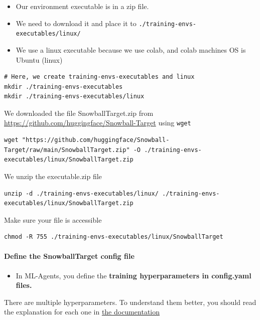 \documentclass[11pt,a4paper]{article}
\begin{document}
\begin{itemize}
\tightlist
\item
  Our environment executable is in a zip file.
\item
  We need to download it and place it to \texttt{./training-envs-executables/linux/}
\item
  We use a linux executable because we use colab, and colab machines OS is Ubuntu (linux)
\end{itemize}

\begin{lstlisting}
# Here, we create training-envs-executables and linux
mkdir ./training-envs-executables
mkdir ./training-envs-executables/linux
\end{lstlisting}

We downloaded the file SnowballTarget.zip from \url{https://github.com/huggingface/Snowball-Target} using \texttt{wget}

\begin{lstlisting}
wget "https://github.com/huggingface/Snowball-Target/raw/main/SnowballTarget.zip" -O ./training-envs-executables/linux/SnowballTarget.zip
\end{lstlisting}

We unzip the executable.zip file

\begin{lstlisting}
unzip -d ./training-envs-executables/linux/ ./training-envs-executables/linux/SnowballTarget.zip
\end{lstlisting}

Make sure your file is accessible

\begin{lstlisting}
chmod -R 755 ./training-envs-executables/linux/SnowballTarget
\end{lstlisting}

\paragraph{Define the SnowballTarget config file}\label{define-the-snowballtarget-config-file}

\begin{itemize}
\tightlist
\item
  In ML-Agents, you define the \textbf{training hyperparameters in config.yaml files.}
\end{itemize}

There are multiple hyperparameters. To understand them better, you should read the explanation for each one in \href{https://github.com/Unity-Technologies/ml-agents/blob/release_20_docs/docs/Training-Configuration-File.md}{the documentation}
\end{document}
